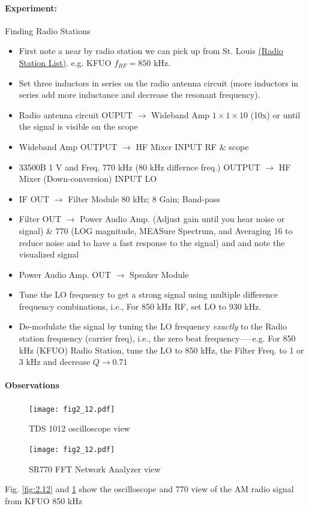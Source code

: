 \documentclass[../main.tex]{subfiles}
\begin{document}
\paragraph*{Experiment:} Finding Radio Stations 
\begin{itemize}
    \item First note a near by radio station we can pick up from St. Louis \href{https://radio-locator.com/cgi-bin/locate?select=city&city=saint+louis&state=mo&x=0&y=0}{(Radio Station List)}. e.g. KFUO $f_{RF} = 850$ kHz.
    \item Set three inductors in series on the radio antenna circuit (more inductors in series add more inductance and decrease the resonant frequency).
    \item Radio antenna circuit OUPUT $\to$ Wideband Amp  $1\times 1 \times 10$ (10x) or until the signal is visible on the scope
    \item Wideband Amp OUTPUT $\to$ HF Mixer INPUT RF \& scope
    \item 33500B 1 V and Freq. 770 kHz (80 kHz differnce freq.) OUTPUT $\to$ HF Mixer (Down-conversion) INPUT LO 
    \item IF OUT $\to$ Filter Module 80 kHz; 8 Gain; Band-pass
    \item Filter OUT $\to$ Power Audio Amp. (Adjust gain until you hear noise or signal) \& 770 (LOG magnitude, MEASure Spectrum, and Averaging 16 to reduce noise and to have a fast response to the signal) and and note the visualized signal
    \item Power Audio Amp. OUT $\to$ Speaker Module
    \item Tune the LO frequency to get a strong signal using multiple difference frequency combinations, i.e., For 850 kHz RF, set LO to 930 kHz.
    \item De-modulate the signal by tuning the LO frequency \textit{exactly} to the Radio station frequency (carrier freq), i.e., the zero beat frequency—--e.g. For 850 kHz (KFUO) Radio Station, tune the LO to 850 kHz, the Filter Freq. to 1 or 3 kHz and decrease $Q \to 0.71$
\end{itemize}

\paragraph*{Observations} 
\begin{figure}[ht]
    \centering
    \begin{minipage}{0.45\textwidth}
        \centering
        \texttt{[image: fig2\_12.pdf]}
        \caption{TDS 1012 oscilloscope view}
        \label{fig:2.12}
    \end{minipage}\hfill
    \begin{minipage}{0.45\textwidth}
        \centering
        \texttt{[image: fig2\_12.pdf]}
        \caption{SR770 FFT Network Analyzer view}
        \label{fig:2.12b}
    \end{minipage}
\end{figure}
Fig. \ref{fig:2.12} and \ref{fig:2.12b} show the oscilloscope and 770 view of the AM radio signal from KFUO 850 kHz 
\end{document}
